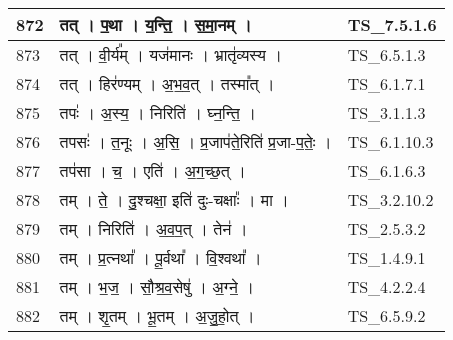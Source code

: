 \documentclass[17pt]{extarticle}
\begin{document}
\begin{longtable}{||p{0.4in}||p{4.9in}||p{0.9in}||}
    \hline
        
    872 & तत्   ।   प॒था   ।   य॒न्ति॒   ।   स॒मा॒नम्   ।    & TS\_7.5.1.6       \\
    
    \hline
        
    873 & तत्   ।   वी॒र्य᳚म्   ।   यज॑मानः   ।   भ्रातृ॑व्यस्य   ।    & TS\_6.5.1.3       \\
    
    \hline
        
    874 & तत्   ।   हिर॑ण्यम्   ।   अ॒भ॒व॒त्   ।   तस्मा᳚त्   ।    & TS\_6.1.7.1       \\
    
    \hline
        
    875 & तपः॑   ।   अ॒स्य॒   ।   निरिति॑   ।   घ्न॒न्ति॒   ।    & TS\_3.1.1.3       \\
    
    \hline
        
    876 & तपसः॑   ।   त॒नूः   ।   अ॒सि॒   ।   प्र॒जाप॑ते॒रिति॑ प्र॒जा{-}प॒तेः॒   ।    & TS\_6.1.10.3       \\
    
    \hline
        
    877 & तप॑सा   ।   च॒   ।   एति॑   ।   अ॒ग॒च्छ॒त्   ।    & TS\_6.1.6.3       \\
    
    \hline
        
    878 & तम्   ।   ते॒   ।   दु॒श्चक्षा॒ इति॑ दुः{-}चक्षाः᳚   ।   मा   ।    & TS\_3.2.10.2       \\
    
    \hline
        
    879 & तम्   ।   निरिति॑   ।   अ॒व॒प॒त्   ।   तेन॑   ।    & TS\_2.5.3.2       \\
    
    \hline
        
    880 & तम्   ।   प्र॒त्नथा᳚   ।   पू॒र्वथा᳚   ।   वि॒श्वथा᳚   ।    & TS\_1.4.9.1       \\
    
    \hline
        
    881 & तम्   ।   भ॒ज॒   ।   सौ॒श्र॒व॒सेषु॑   ।   अ॒ग्ने॒   ।    & TS\_4.2.2.4       \\
    
    \hline
        
    882 & तम्   ।   शृ॒तम्   ।   भू॒तम्   ।   अ॒जु॒हो॒त्   ।    & TS\_6.5.9.2       \\
    
    \hline
        

\end{longtable}
\end{document}
